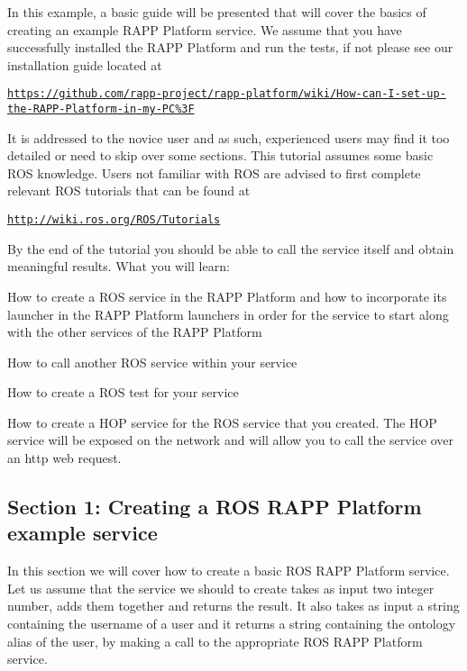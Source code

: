 In this example, a basic guide will be presented that will cover the basics of creating an example R\-A\-P\-P Platform service. We assume that you have successfully installed the R\-A\-P\-P Platform and run the tests, if not please see our installation guide located at

\href{https://github.com/rapp-project/rapp-platform/wiki/How-can-I-set-up-the-RAPP-Platform-in-my-PC%3F}{\tt https\-://github.\-com/rapp-\/project/rapp-\/platform/wiki/\-How-\/can-\/\-I-\/set-\/up-\/the-\/\-R\-A\-P\-P-\/\-Platform-\/in-\/my-\/\-P\-C\%3\-F}

It is addressed to the novice user and as such, experienced users may find it too detailed or need to skip over some sections. This tutorial assumes some basic R\-O\-S knowledge. Users not familiar with R\-O\-S are advised to first complete relevant R\-O\-S tutorials that can be found at

\href{http://wiki.ros.org/ROS/Tutorials}{\tt http\-://wiki.\-ros.\-org/\-R\-O\-S/\-Tutorials}

By the end of the tutorial you should be able to call the service itself and obtain meaningful results. What you will learn\-:


\begin{DoxyItemize}
\item How to create a R\-O\-S service in the R\-A\-P\-P Platform and how to incorporate its launcher in the R\-A\-P\-P Platform launchers in order for the service to start along with the other services of the R\-A\-P\-P Platform
\item How to call another R\-O\-S service within your service
\item How to create a R\-O\-S test for your service
\item How to create a H\-O\-P service for the R\-O\-S service that you created. The H\-O\-P service will be exposed on the network and will allow you to call the service over an http web request.
\end{DoxyItemize}

\subsection*{Section 1\-: Creating a R\-O\-S R\-A\-P\-P Platform example service}

In this section we will cover how to create a basic R\-O\-S R\-A\-P\-P Platform service. Let us assume that the service we should to create takes as input two integer number, adds them together and returns the result. It also takes as input a string containing the username of a user and it returns a string containing the ontology alias of the user, by making a call to the appropriate R\-O\-S R\-A\-P\-P Platform service.

